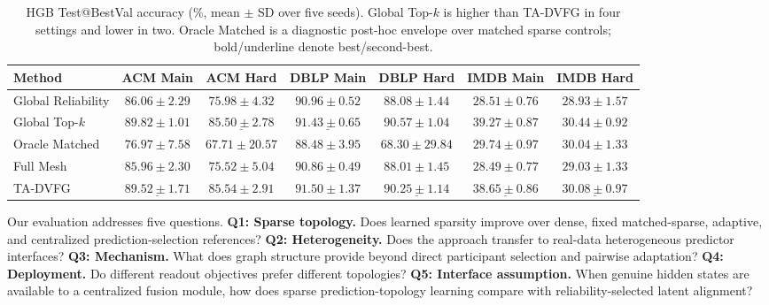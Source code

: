 \documentclass[letterpaper]{article} %
\newcommand{\method}{\textsc{TA-DVFG}}
\begin{document}
\begin{table}[!t]
\centering
\footnotesize
\setlength{\tabcolsep}{3.1pt}
\caption{HGB Test@BestVal accuracy (\%, mean $\pm$ SD over five seeds).
Global Top-$k$ is higher than \method{} in four settings and lower in two.
Oracle Matched is a diagnostic post-hoc envelope over matched sparse controls;
bold/underline denote best/second-best.}
\label{tab:hgb-main}
\begin{tabular}{lcccccc}
\toprule
Method & ACM Main & ACM Hard & DBLP Main & DBLP Hard & IMDB Main & IMDB Hard \\
\midrule
Global Reliability & $86.06\pm2.29$ & $75.98\pm4.32$ & $90.96\pm0.52$ & $88.08\pm1.44$ & $28.51\pm0.76$ & $28.93\pm1.57$ \\
Global Top-$k$ & $\mathbf{89.82\pm1.01}$ & $\underline{85.50\pm2.78}$ & $\underline{91.43\pm0.65}$ & $\mathbf{90.57\pm1.04}$ & $\mathbf{39.27\pm0.87}$ & $\mathbf{30.44\pm0.92}$ \\
Oracle Matched & $76.97\pm7.58$ & $67.71\pm20.57$ & $88.48\pm3.95$ & $68.30\pm29.84$ & $29.74\pm0.97$ & $30.04\pm1.33$ \\
Full Mesh & $85.96\pm2.30$ & $75.52\pm5.04$ & $90.86\pm0.49$ & $88.01\pm1.45$ & $28.49\pm0.77$ & $29.03\pm1.33$ \\
\method{} & $\underline{89.52\pm1.71}$ & $\mathbf{85.54\pm2.91}$ & $\mathbf{91.50\pm1.37}$ & $\underline{90.25\pm1.14}$ & $\underline{38.65\pm0.86}$ & $\underline{30.08\pm0.97}$ \\
\bottomrule
\end{tabular}
\end{table}


Our evaluation addresses five questions.
\textbf{Q1: Sparse topology.}
Does learned sparsity improve over dense, fixed matched-sparse, adaptive,
and centralized prediction-selection references?
\textbf{Q2: Heterogeneity.}
Does the approach transfer to real-data heterogeneous predictor interfaces?
\textbf{Q3: Mechanism.}
What does graph structure provide beyond direct participant selection and
pairwise adaptation?
\textbf{Q4: Deployment.}
Do different readout objectives prefer different topologies?
\textbf{Q5: Interface assumption.}
When genuine hidden states are available to a centralized fusion module, how
does sparse prediction-topology learning compare with reliability-selected
latent alignment?
\end{document}
